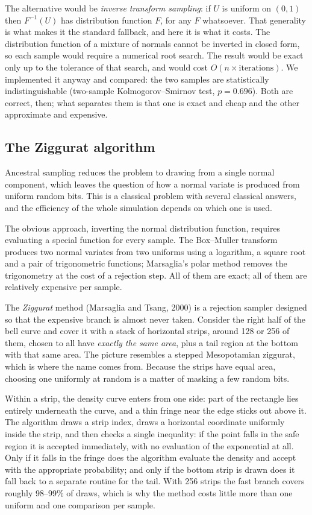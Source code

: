 \documentclass[11pt]{article}
\begin{document}
The alternative would be \emph{inverse transform sampling}: if $U$ is uniform on $(0,1)$ then
$F^{-1}(U)$ has distribution function $F$, for any $F$ whatsoever. That generality is
what makes it the standard fallback, and here it is what it costs. The distribution function
of a mixture of normals cannot be inverted in closed form, so each sample would require a
numerical root search. The result would be exact only up to the tolerance of that search, and would cost
$O(n \times \text{iterations})$. We implemented it anyway and compared: the two samples are
statistically indistinguishable (two-sample Kolmogorov--Smirnov test, $p = 0.696$). Both are correct, then; what
separates them is that one is exact and cheap and the other approximate and expensive.

\subsection{The Ziggurat algorithm}

Ancestral sampling reduces the problem to drawing from a single normal component, which
leaves the question of how a normal variate is produced from uniform random bits. This is a
classical problem with several classical answers, and the efficiency of the whole simulation
depends on which one is used.

The obvious approach, inverting the normal distribution function, requires evaluating a
special function for every sample. The Box--Muller transform produces two normal variates
from two uniforms using a logarithm, a square root and a pair of trigonometric functions;
Marsaglia's polar method removes the trigonometry at the cost of a rejection step. All of
them are exact; all of them are relatively expensive per sample.

The \emph{Ziggurat} method (Marsaglia and Tsang, 2000) is a rejection sampler designed so
that the expensive branch is almost never taken. Consider the right half of the bell curve
and cover it with a stack of horizontal strips, around 128 or 256 of them, chosen to
all have \emph{exactly the same area}, plus a tail region at the bottom with that same area.
The picture resembles a stepped Mesopotamian ziggurat, which is where the name comes from.
Because the strips have equal area, choosing one uniformly at random is a matter of masking a
few random bits.

Within a strip, the density curve enters from one side: part of the rectangle lies entirely
underneath the curve, and a thin fringe near the edge sticks out above it. The algorithm
draws a strip index, draws a horizontal coordinate uniformly inside the strip, and then
checks a single inequality: if the point falls in the safe region it is accepted immediately,
with no evaluation of the exponential at all. Only if it falls in the fringe does the
algorithm evaluate the density and accept with the appropriate probability; and only if the
bottom strip is drawn does it fall back to a separate routine for the tail. With 256 strips
the fast branch covers roughly 98--99\% of draws, which is why the method costs little more
than one uniform and one comparison per sample.
\end{document}
